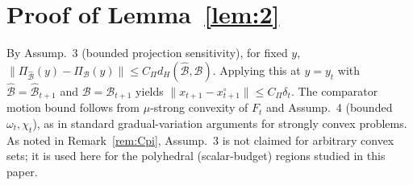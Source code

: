 \section{Proof of Lemma~\ref{lem:2}}
\label{app:lem2}

By Assump.~3 (bounded projection sensitivity), for fixed $y$,
$\|\Pi_{\hat{\mathcal{B}}}(y)-\Pi_{\mathcal{B}}(y)\|\le C_\Pi d_H(\hat{\mathcal{B}},\mathcal{B})$.
Applying this at $y=y_t$ with $\hat{\mathcal{B}}=\hat{\mathcal{B}}_{t+1}$ and $\mathcal{B}=\mathcal{B}_{t+1}$ yields
$\|x_{t+1}-x_{t+1}^\circ\|\le C_\Pi\delta_t$.
The comparator motion bound follows from $\mu$-strong convexity of $F_t$ and Assump.~4 (bounded $\omega_t,\chi_t$), as in standard gradual-variation arguments for strongly convex problems.
As noted in Remark~\ref{rem:Cpi}, Assump.~3 is not claimed for arbitrary convex sets; it is used here for the polyhedral (scalar-budget) regions studied in this paper.
